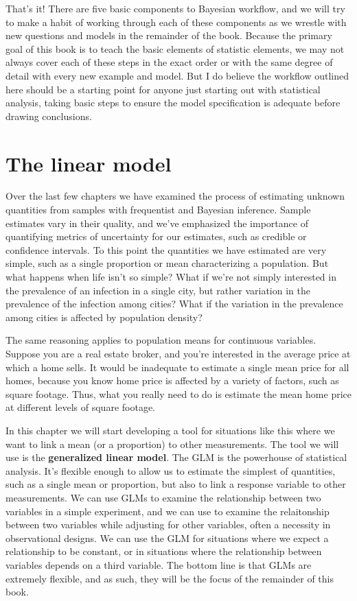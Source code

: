\documentclass[
]{book}
\begin{document}
That's it! There are five basic components to Bayesian workflow, and we will try to make a habit of working through each of these components as we wrestle with new questions and models in the remainder of the book. Because the primary goal of this book is to teach the basic elements of statistic elements, we may not always cover each of these steps in the exact order or with the same degree of detail with every new example and model. But I do believe the workflow outlined here should be a starting point for anyone just starting out with statistical analysis, taking basic steps to ensure the model specification is adequate before drawing conclusions.

\chapter{The linear model}\label{the-linear-model}

Over the last few chapters we have examined the process of estimating unknown quantities from samples with frequentist and Bayesian inference. Sample estimates vary in their quality, and we've emphasized the importance of quantifying metrics of uncertainty for our estimates, such as credible or confidence intervals. To this point the quantities we have estimated are very simple, such as a single proportion or mean characterizing a population. But what happens when life isn't so simple? What if we're not simply interested in the prevalence of an infection in a single city, but rather variation in the prevalence of the infection among cities? What if the variation in the prevalence among cities is affected by population density?

The same reasoning applies to population means for continuous variables. Suppose you are a real estate broker, and you're interested in the average price at which a home sells. It would be inadequate to estimate a single mean price for all homes, because you know home price is affected by a variety of factors, such as square footage. Thus, what you really need to do is estimate the mean home price at different levels of square footage.

In this chapter we will start developing a tool for situations like this where we want to link a mean (or a proportion) to other measurements. The tool we will use is the \textbf{generalized linear model}. The GLM is the powerhouse of statistical analysis. It's flexible enough to allow us to estimate the simplest of quantities, such as a single mean or proportion, but also to link a response variable to other measurements. We can use GLMs to examine the relationship between two variables in a simple experiment, and we can use to examine the relaitonship between two variables while adjusting for other variables, often a necessity in observational designs. We can use the GLM for situations where we expect a relationship to be constant, or in situations where the relationship between variables depends on a third variable. The bottom line is that GLMs are extremely flexible, and as such, they will be the focus of the remainder of this book.
\end{document}
